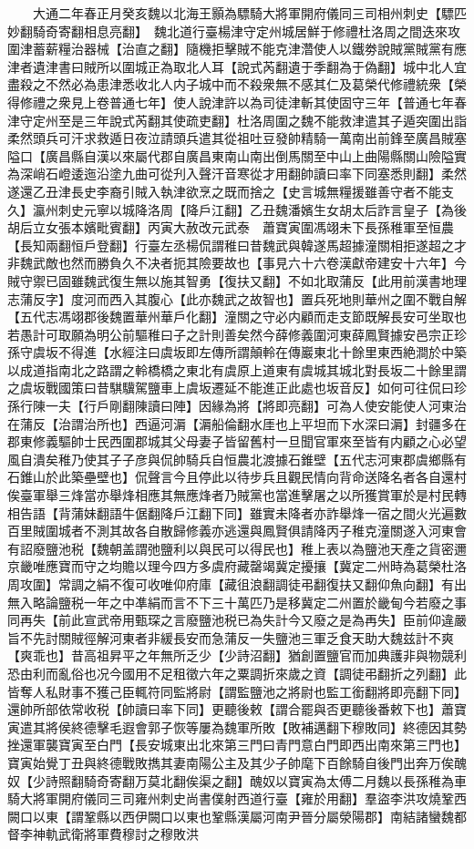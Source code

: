 　　大通二年春正月癸亥魏以北海王顥為驃騎大將軍開府儀同三司相州刺史【驃匹妙翻騎奇寄翻相息亮翻】　魏北道行臺楊津守定州城居鮮于修禮杜洛周之間迭來攻圍津蓄薪糧治器械【治直之翻】隨機拒擊賊不能克津濳使人以鐵劵說賊黨賊黨有應津者遺津書曰賊所以圍城正為取北人耳【說式芮翻遺于季翻為于偽翻】城中北人宜盡殺之不然必為患津悉收北人内子城中而不殺衆無不感其仁及葛榮代修禮統衆【榮得修禮之衆見上卷普通七年】使人說津許以為司徒津斬其使固守三年【普通七年春津守定州至是三年說式芮翻其使疏吏翻】杜洛周圍之魏不能救津遣其子遁突圍出詣柔然頭兵可汗求救遁日夜泣請頭兵遣其從祖吐豆發帥精騎一萬南出前鋒至廣昌賊塞隘口【廣昌縣自漢以來屬代郡自廣昌東南山南出倒馬關至中山上曲陽縣關山險隘實為深峭石嶝逶迤沿塗九曲可從刋入聲汗音寒從才用翻帥讀曰率下同塞悉則翻】柔然遂還乙丑津長史李裔引賊入執津欲烹之既而捨之【史言城無糧援雖善守者不能支久】瀛州刺史元寧以城降洛周【降戶江翻】乙丑魏潘嬪生女胡太后詐言皇子【為後胡后立女張本嬪毗賓翻】丙寅大赦改元武泰　蕭寶寅圍馮翊未下長孫稚軍至恒農【長知兩翻恒戶登翻】行臺左丞楊侃謂稚曰昔魏武與韓遂馬超據潼關相拒遂超之才非魏武敵也然而勝負久不决者扼其險要故也【事見六十六卷漢獻帝建安十六年】今賊守禦已固雖魏武復生無以施其智勇【復扶又翻】不如北取蒲反【此用前漢書地理志蒲反字】度河而西入其腹心【此亦魏武之故智也】置兵死地則華州之圍不戰自解【五代志馮翊郡後魏置華州華戶化翻】潼關之守必内顧而走支節既解長安可坐取也若愚計可取願為明公前驅稚曰子之計則善矣然今薛修義圍河東薛鳳賢據安邑宗正珍孫守虞坂不得進【水經注曰虞坂即左傳所謂顛軨在傳巖東北十餘里東西絶澗於中築以成道指南北之路謂之軨橋橋之東北有虞原上道東有虞城其城北對長坂二十餘里謂之虞坂戰國策曰昔騏驥駕鹽車上虞坂遷延不能進正此處也坂音反】如何可往侃曰珍孫行陳一夫【行戶剛翻陳讀曰陣】因緣為將【將即亮翻】可為人使安能使人河東治在蒲反【治謂治所也】西逼河漘【漘船倫翻水厓也上平坦而下水深曰漘】封疆多在郡東修義驅帥士民西圍郡城其父母妻子皆留舊村一旦聞官軍來至皆有内顧之心必望風自潰矣稚乃使其子子彦與侃帥騎兵自恒農北渡據石錐壁【五代志河東郡虞鄉縣有石錐山於此築壘壁也】侃聲言今且停此以待步兵且觀民情向背命送降名者各自還村俟臺軍舉三烽當亦舉烽相應其無應烽者乃賊黨也當進擊屠之以所獲賞軍於是村民轉相告語【背蒲妹翻語牛倨翻降戶江翻下同】雖實未降者亦詐舉烽一宿之間火光遍數百里賊圍城者不測其故各自散歸修義亦逃還與鳳賢俱請降丙子稚克潼關遂入河東會有詔廢鹽池税【魏朝盖謂弛鹽利以與民可以得民也】稚上表以為鹽池天產之貨密邇京畿唯應寶而守之均贍以理今四方多虞府藏罄竭冀定擾攘【冀定二州時為葛榮杜洛周攻圍】常調之絹不復可收唯仰府庫【藏徂浪翻調徒弔翻復扶又翻仰魚向翻】有出無入略論鹽税一年之中凖絹而言不下三十萬匹乃是移冀定二州置於畿甸今若廢之事同再失【前此宣武帝用甄琛之言廢鹽池税已為失計今又廢之是為再失】臣前仰違嚴旨不先討關賊徑解河東者非緩長安而急蒲反一失鹽池三軍乏食天助大魏兹計不爽【爽乖也】昔高祖昇平之年無所乏少【少詩沼翻】猶創置鹽官而加典護非與物競利恐由利而亂俗也况今國用不足租徵六年之粟調折來歲之資【調徒弔翻折之列翻】此皆奪人私財事不獲己臣輒符同監將尉【謂監鹽池之將尉也監工銜翻將即亮翻下同】還帥所部依常收税【帥讀曰率下同】更聽後敕【謂合罷與否更聽後番敕下也】蕭寶寅遣其將侯終德擊毛遐會郭子恢等屢為魏軍所敗【敗補邁翻下穆敗同】終德因其勢挫還軍襲寶寅至白門【長安城東出北來第三門曰青門意白門即西出南來第三門也】寶寅始覺丁丑與終德戰敗擕其妻南陽公主及其少子帥麾下百餘騎自後門出奔万俟醜奴【少詩照翻騎奇寄翻万莫北翻俟渠之翻】醜奴以寶寅為太傅二月魏以長孫稚為車騎大將軍開府儀同三司雍州刺史尚書僕射西道行臺【雍於用翻】羣盜李洪攻燒鞏西闕口以東【謂鞏縣以西伊闕口以東也鞏縣漢屬河南尹晉分屬滎陽郡】南結諸蠻魏都督李神軌武衛將軍費穆討之穆敗洪